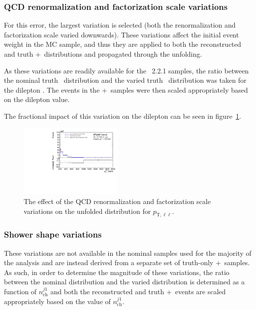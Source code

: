 \subsubsection{QCD renormalization and factorization scale variations}
For this error, the largest variation is selected (both the renormalization and factorization scale varied downwards). These variations affect the initial event weight in the MC sample, and thus they are applied to both the reconstructed and truth \powheg+\pythia~distributions and propagated through the unfolding.

As these variations are readily available for the \sherpa~2.2.1 samples, the ratio between the nominal truth \sherpa~distribution and the varied truth \sherpa~distribution was taken for the dilepton \pt. The events in the \powheg+\pythia~samples were then scaled appropriately based on the dilepton \pt value.

The fractional impact of this variation on the dilepton \pt can be seen in figure~\ref{fig:qcdSystErr}.

\begin{figure}[h!]
  \centering
  \includegraphics[page=38,width=0.45\textwidth]{figures/IBUPlots.pdf}
  \caption{The effect of the QCD renormalization and factorization scale variations on the unfolded distribution for $p_{\text{T},\ell\ell}$.}
  \label{fig:qcdSystErr}
\end{figure}

\subsubsection{Shower shape variations}
These variations are not available in the nominal samples used for the majority of the analysis and are instead derived from a separate set of truth-only \powheg+\pythia~samples. As such, in order to determine the magnitude of these variations, the ratio between the nominal distribution and the varied distribution is determined as a function of $n_{\text{ch}}^{j1}$ and both the reconstructed and truth \powheg+\pythia~events are scaled appropriately based on the value of $n_{\text{ch}}^{j1}$. 

